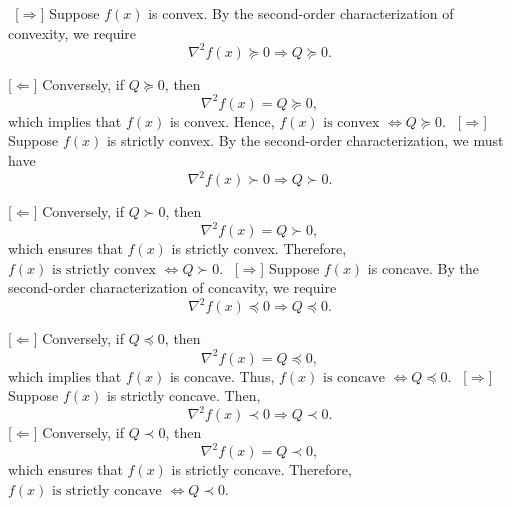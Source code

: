 \documentclass[solution,addpoints,12pt]{exam}
\begin{document}
\begin{questions}
\begin{parts}
\begin{solution}
	\begin{subparts}
		
		\subpart~[$\Rightarrow$] Suppose $f(x)$ is convex.  
		By the second-order characterization of convexity, we require
		\[
		\nabla^2 f(x) \succeq 0 \Rightarrow Q \succeq 0.
		\]
		
		[$\Leftarrow$] Conversely, if $Q \succeq 0$, then
		\[
		\nabla^2 f(x) = Q \succeq 0,
		\]
		which implies that $f(x)$ is convex.  
		Hence,
		$
		f(x) \text{ is convex } \Leftrightarrow Q \succeq 0.
		$
		\subpart~[$\Rightarrow$] Suppose $f(x)$ is strictly convex.  
		By the second-order characterization, we must have
		\[
		\nabla^2 f(x) \succ 0 \Rightarrow Q \succ 0.
		\]
		
		[$\Leftarrow$] Conversely, if $Q \succ 0$, then
		\[
		\nabla^2 f(x) = Q \succ 0,
		\]
		which ensures that $f(x)$ is strictly convex.  
		Therefore,
		$
		f(x) \text{ is strictly convex } \Leftrightarrow Q \succ 0.
		$	
		\subpart~[$\Rightarrow$] Suppose $f(x)$ is concave.  
		By the second-order characterization of concavity, we require
		\[
		\nabla^2 f(x) \preceq 0 \Rightarrow Q \preceq 0.
		\]
		
		[$\Leftarrow$] Conversely, if $Q \preceq 0$, then
		\[
		\nabla^2 f(x) = Q \preceq 0,
		\]
		which implies that $f(x)$ is concave.  
		Thus,
		$
		f(x) \text{ is concave } \Leftrightarrow Q \preceq 0.
		$
		\subpart~[$\Rightarrow$] Suppose $f(x)$ is strictly concave.  
		Then,
		\[
		\nabla^2 f(x) \prec 0 \Rightarrow Q \prec 0.
		\]
		[$\Leftarrow$] Conversely, if $Q \prec 0$, then
		\[
		\nabla^2 f(x) = Q \prec 0,
		\]
		which ensures that $f(x)$ is strictly concave.  
		Therefore,
		$f(x) \text{ is strictly concave } \Leftrightarrow Q \prec 0.$
		
	\end{subparts}
	
	
	\noindent 
	
\end{solution}
\end{parts}


\\
\begin{parts}

\end{parts}
\end{questions}
\end{document}
